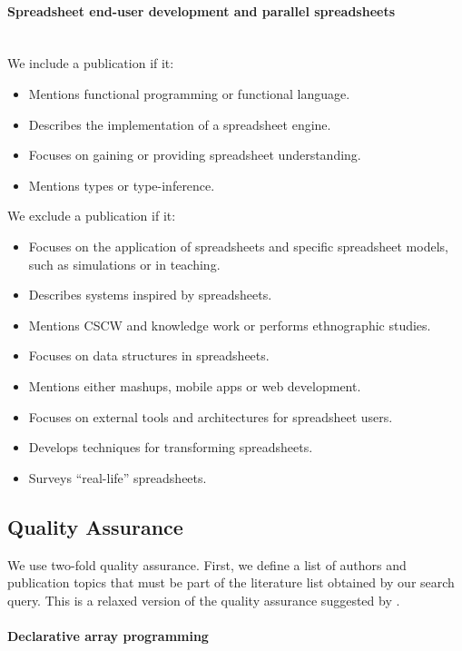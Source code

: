 \documentclass[a4paper]{article}
\begin{document}
\paragraph{Spreadsheet end-user development and parallel spreadsheets}
~\\

We include a publication if it:

\begin{itemize}
\item Mentions functional programming or functional language.
\item Describes the implementation of a spreadsheet engine.
\item Focuses on gaining or providing spreadsheet understanding.
\item Mentions types or type-inference.
\end{itemize}

We exclude a publication if it:

\begin{itemize}
\item Focuses on the application of spreadsheets and specific
  spreadsheet models, such as simulations or in teaching.
\item Describes systems inspired by spreadsheets.
\item Mentions CSCW and knowledge work or performs ethnographic
  studies.
\item Focuses on data structures in spreadsheets.
\item Mentions either mashups, mobile apps or web development.
\item Focuses on external tools and architectures for spreadsheet
  users.
\item Develops techniques for transforming spreadsheets.
\item Surveys ``real-life'' spreadsheets.
\end{itemize}

\subsection{Quality Assurance}
\label{sec:quality-assurance}

We use two-fold quality assurance. First, we define a list of authors
and publication topics that must be part of the literature list
obtained by our search query. This is a relaxed version of the quality
assurance suggested by \citet{keele2007guidelines}.

\paragraph{Declarative array programming}
\end{document}

